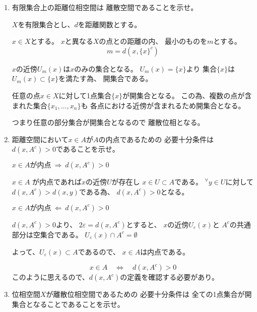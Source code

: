 \documentclass[12pt,b5paper]{ltjsarticle}
\begin{document}
\begin{enumerate}
 \item
      有限集合上の距離位相空間は
      離散空間であることを示せ。

\dotfill

      $X$を有限集合とし、$d$を距離関数とする。

      $x\in X$とする。
      $x$と異なる$X$の点との距離の内、
      最小のものを$m$とする。
      \begin{equation}
       m = d(x,\{x\}^{c})
      \end{equation}

      $x$の近傍$U_{m}(x)$は$x$のみの集合となる。
      $U_{m}(x)=\{x\}$より
      集合$\{x\}$は$U_{m}(x) \subset \{x\}$を満たす為、
      開集合である。

      任意の点$x\in X$に対して1点集合$\{x\}$が開集合となる。
      この為、複数の点が含まれた集合$\{x_1,\dots,x_n\}$も
      各点における近傍が含まれるため開集合となる。

      つまり任意の部分集合が開集合となるので
      離散位相となる。

\hrulefill
 \item
      距離空間において$x\in A$が$A$の内点であるための
      必要十分条件は
      $d(x,A^{c})>0$であることを示せ。

      \dotfill
      $x\in A \text{が内点}\ \Rightarrow \ d(x,A^{c})>0$
      \dotfill

      $x\in A$ が内点であれば$x$の近傍$U$が存在し
      $x\in U \subset A$である。
      ${}^\forall{}y\in U$に対して
      $d(x,A^{c})>d(x,y)$である為、
      $d(x,A^{c})>0$となる。

      \dotfill
      $x\in A \text{が内点}\ \Leftarrow \ d(x,A^{c})>0$
      \dotfill

      $d(x,A^{c})>0$より、
      $2\varepsilon=d(x,A^{c})$とすると、
      $x$の近傍$U_{\varepsilon}(x)$と
      $A^{c}$の共通部分は空集合である。
      $U_{\varepsilon}(x)\cap A^{c} = \emptyset$

      よって、$U_{\varepsilon}(x)\subset A$であるので、
      $x\in A$は内点である。

\dotfill


      \begin{equation}
       x\in A \quad \Leftrightarrow \quad d(x,A^{c})>0
      \end{equation}
      このように思えるので、$d(x,A^{c})$の定義を確認する必要があり。

\hrulefill
 \item
      位相空間$X$が離散位相空間であるための
      必要十分条件は
      全ての1点集合が開集合となることであることを示せ。


\end{enumerate}
\end{document}
